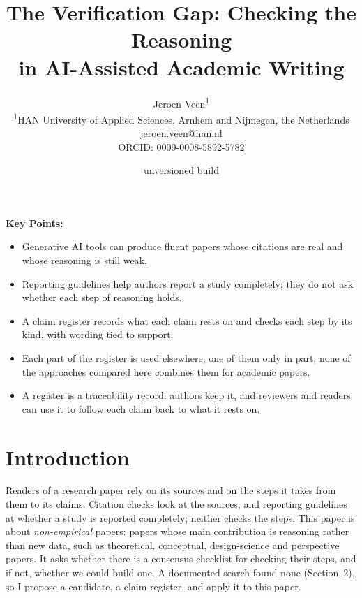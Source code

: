 \documentclass[12pt, a4paper]{article}
\title{The Verification Gap: Checking the Reasoning\\
       in AI-Assisted Academic Writing}
\author{Jeroen Veen\textsuperscript{1}\\[4pt]
        \small\textsuperscript{1}HAN University of Applied Sciences, Arnhem and Nijmegen, the Netherlands\\
        \small jeroen.veen@han.nl\\
        \small ORCID: \href{https://orcid.org/0009-0008-5892-5782}{0009-0008-5892-5782}}
\date{\ifdefined\paperversion\paperversion\else unversioned build\fi}
\begin{document}
\maketitle
\ifdefined\preprintmode{}\fi

\medskip\noindent
\textbf{Key Points:}
\begin{itemize}
\item Generative AI tools can produce fluent papers whose citations are real and whose reasoning is still weak.
\item Reporting guidelines help authors report a study completely; they do not ask whether each step of reasoning holds.
\item A claim register records what each claim rests on and checks each step by its kind, with wording tied to support.
\item Each part of the register is used elsewhere, one of them only in part; none of the approaches compared here combines them for academic papers.
\item A register is a traceability record: authors keep it, and reviewers and readers can use it to follow each claim back to what it rests on.
\end{itemize}

\clearpage

\section{Introduction}

Readers of a research paper rely on its sources and on the steps it
takes from them to its claims.  Citation checks look at the sources,
and reporting guidelines at whether a study is reported completely;
neither checks the steps.
This paper is about \emph{non-empirical} papers: papers whose main
contribution is reasoning rather than new data, such as theoretical,
conceptual, design-science and perspective papers.  It asks whether
there is a consensus checklist for checking their steps, and if not,
whether we could build one.
A documented search found none (Section~2), so I propose a candidate,
a claim register, and apply it to this paper.
\end{document}
